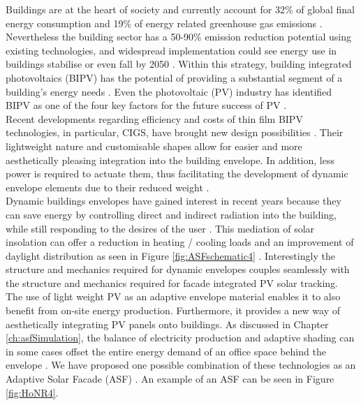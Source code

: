 
Buildings are at the heart of society and currently account for 32\% of global final energy consumption and 19\% of energy related greenhouse gas emissions \cite{IPCC}. Nevertheless the building sector has a 50-90\% emission reduction potential using existing technologies, and widespread implementation could see energy use in buildings stabilise or even fall by 2050 \cite{IPCC}. Within this strategy, building integrated photovoltaics (BIPV) has the potential of providing a substantial segment of a building's energy needs \cite{defaix2012technical}. Even the photovoltaic (PV) industry has identified BIPV as one of the four key factors for the future success of PV \cite{raugei2009life}. \\

Recent developments regarding efficiency and costs of thin film BIPV technologies, in particular, CIGS, have brought new design possibilities \cite{NREL, kushiya2014cis, kaelin2004low, jelle2012building}. Their lightweight nature and customisable shapes allow for easier and more aesthetically pleasing integration into the building envelope. In addition, less power is required to actuate them, thus facilitating the development of dynamic envelope elements due to their reduced weight \cite{rossi2012adaptive}. \\





Dynamic buildings envelopes have gained interest in recent years because they can save energy by controlling direct and indirect radiation into the building, while still responding to the desires of the user \cite{loonen2013climate}. This mediation of solar insolation can offer a reduction in heating / cooling loads and an improvement of daylight distribution as seen in Figure \ref{fig:ASFschematic4} \cite{rossi2012adaptive}. Interestingly the structure and mechanics required for dynamic envelopes couples seamlessly with the structure and mechanics required for facade integrated PV solar tracking. The use of light weight PV as an adaptive envelope material enables it to also benefit from on-site energy production. Furthermore, it provides a new way of aesthetically integrating PV panels onto buildings. As discussed in Chapter \ref{ch:asfSimulation}, the balance of electricity production and adaptive shading can in some cases offset the entire energy demand of an office space behind the envelope \cite{jayathissa2015abs}. We have proposed one possible combination of these technologies as an Adaptive Solar Facade (ASF) \cite{nagy2016adaptive}. An example of an ASF can be seen in Figure \ref{fig:HoNR4}.




